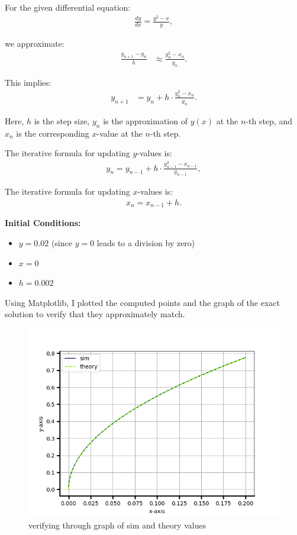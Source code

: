 \documentclass[article]{IEEEtran}
\numberwithin{figure}{enumi}
\begin{document}
For the given differential equation:  
\begin{align}
    \frac{dy}{dx} = \frac{y^2 - x}{y},
\end{align}

we approximate:  
\begin{align}
    \frac{y_{n+1} - y_n}{h} &\approx \frac{y_n^2 - x_n}{y_n}.
\end{align}

This implies:  
\begin{align}
    y_{n+1} &= y_n + h \cdot \frac{y_n^2 - x_n}{y_n}.
\end{align}

Here, $h$ is the step size, $y_n$ is the approximation of $y(x)$ at the $n$-th step, and $x_n$ is the corresponding $x$-value at the $n$-th step.  

\noindent The iterative formula for updating $y$-values is:  
\begin{align}
    y_n = y_{n-1} + h \cdot \frac{y_{n-1}^2 - x_{n-1}}{y_{n-1}},
\end{align}

The iterative formula for updating $x$-values is:  
\begin{align}
    x_n = x_{n-1} + h.
\end{align}

\noindent\textbf{Initial Conditions:}  
\begin{itemize}
    \item $y = 0.02$ (since \(y = 0\) leads to a division by zero)
    \item $x = 0$
    \item $h = 0.002$
\end{itemize}

Using Matplotlib, I plotted the computed points and the graph of the exact solution to verify that they approximately match.  

\begin{figure}[h!]
	\centering
	\includegraphics[width=\columnwidth]{figures/Figure_1.png}
	\caption{verifying through graph of sim and theory values}
	\label{stemplot}
\end{figure}
\end{document}
